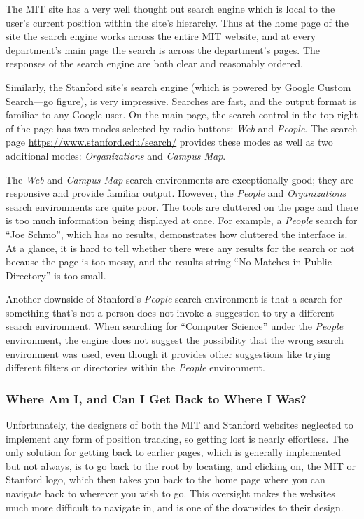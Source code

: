 The MIT site has a very well thought out search engine which is local to the user's current
position within the site's hierarchy. Thus at the home page of the site the search engine
works across the entire MIT website, and at every department's main page the search is
across the department's pages. The responses of the search engine are both clear and
reasonably ordered.

Similarly, the Stanford site's search engine (which is powered by Google Custom
Search---go figure), is very impressive. Searches are fast, and the output format is
familiar to any Google user. On the main page, the search control in the top right
of the page has two modes selected by radio buttons: \textsl{Web} and \textsl{People}.
The search page \url{https://www.stanford.edu/search/} provides these modes as well
as two additional modes: \textsl{Organizations} and \textsl{Campus Map}.

The \textsl{Web} and \textsl{Campus Map} search environments are exceptionally good;
they are responsive and provide familiar output. However, the \textsl{People} and
\textsl{Organizations} search environments are quite poor. The tools are
cluttered on the page and there is too much information being displayed at once.
For example, a \textsl{People} search for ``Joe Schmo'', which has no results,
demonstrates how cluttered the interface is. At a glance, it is hard to tell
whether there were any results for the search or not because the page is too
messy, and the results string ``No Matches in Public Directory'' is too small.

Another downside of Stanford's \textsl{People} search environment is that a search
for something that's not a person does not invoke a suggestion to try a different
search environment. When searching for ``Computer Science'' under the \textsl{People}
environment, the engine does not suggest the possibility that the wrong search
environment was used, even though it provides other suggestions like trying
different filters or directories within the \textsl{People} environment.

\subsubsection*{Where Am I, and Can I Get Back to Where I Was?}

Unfortunately, the designers of both the MIT and Stanford websites neglected to
implement any form of position tracking, so getting lost is nearly effortless.
The only solution for getting back to earlier pages, which is generally implemented
but not always, is to go back to the root by locating, and clicking on, the MIT or
Stanford logo, which then takes you back to the home page where you can navigate
back to wherever you wish to go. This oversight makes the websites much more
difficult to navigate in, and is one of the downsides to their design.

